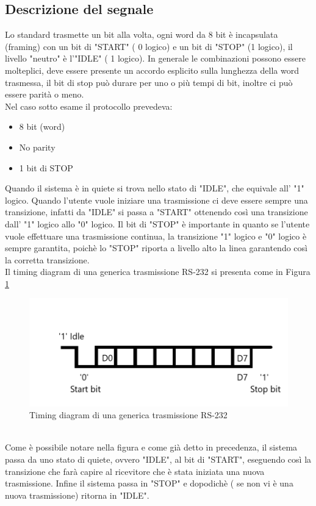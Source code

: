 \documentclass[a4paper, titlepage]{article}
\begin{document}
\subsection{Descrizione del segnale}
Lo standard trasmette un bit alla volta, ogni word da 8 bit è incapsulata (framing) con un bit di "START" ( 0 logico) e un bit di "STOP" (1 logico), il livello "neutro" è l'"IDLE" ( 1 logico). In generale le combinazioni possono essere molteplici, deve essere presente un accordo esplicito sulla lunghezza della word trasmessa, il bit di stop può durare per uno o più tempi di bit,  inoltre ci può essere parità o meno.\\
Nel caso sotto esame il protocollo prevedeva:
\begin{itemize}
\item 8 bit (word)
\item No parity
\item 1 bit di STOP
\end{itemize}
Quando il sistema è in quiete si trova nello stato di "IDLE", che equivale all' "1" logico. Quando l'utente vuole iniziare una trasmissione ci deve essere sempre una transizione, infatti da "IDLE" si passa a "START" ottenendo così una transizione dall' "1" logico allo "0" logico. Il bit di "STOP" è importante in quanto se l'utente vuole effettuare una trasmissione continua, la transizione "1" logico e "0" logico è sempre garantita, poichè lo "STOP" riporta a livello alto la linea garantendo così la corretta transizione.\\
Il timing diagram di una generica trasmissione RS-232 si presenta come in Figura \ref{fig:timing_RS}
\pagebreak
\begin{figure}[h]
\centering
\includegraphics[scale=0.5]{RS232}
\caption{Timing diagram di una generica trasmissione RS-232}
\label{fig:timing_RS}
\end{figure}\\
Come è possibile notare nella figura e come già detto in precedenza, il sistema passa da uno stato di quiete, ovvero "IDLE", al bit di "START", eseguendo così la transizione che farà capire al ricevitore che è stata iniziata una nuova trasmissione. Infine il sistema passa in "STOP" e dopodichè ( se non vi è una nuova trasmissione) ritorna in "IDLE".
\end{document}
